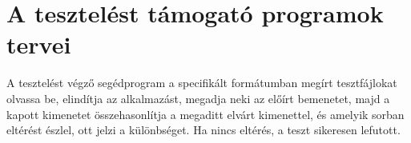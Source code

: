 \section{A tesztelést támogató programok tervei}

A tesztelést végző segédprogram a specifikált formátumban megírt tesztfájlokat olvassa be, elindítja az alkalmazást, megadja neki az előírt bemenetet, majd a kapott kimenetet összehasonlítja a megaditt elvárt kimenettel, és amelyik sorban eltérést észlel, ott jelzi a különbséget. Ha nincs eltérés, a teszt sikeresen lefutott.